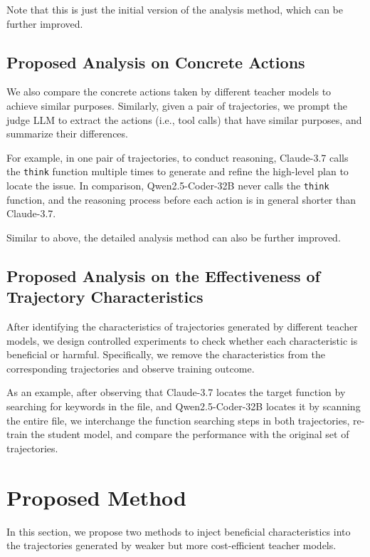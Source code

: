 Note that this is just the initial version of the analysis method, which can be further improved.

\subsection{Proposed Analysis on Concrete Actions}
We also compare the concrete actions taken by different teacher models to achieve similar purposes.
Similarly, given a pair of trajectories, we prompt the judge LLM to extract the actions (i.e., tool calls) that have similar purposes, and summarize their differences.

For example, in one pair of trajectories, to conduct reasoning, Claude-3.7 calls the \texttt{think} function multiple times to generate and refine the high-level plan to locate the issue.
In comparison, Qwen2.5-Coder-32B never calls the \texttt{think} function, and the reasoning process before each action is in general shorter than Claude-3.7.

Similar to above, the detailed analysis method can also be further improved.

\subsection{Proposed Analysis on the Effectiveness of Trajectory Characteristics}
After identifying the characteristics of trajectories generated by different teacher models, we design controlled experiments to check whether each characteristic is beneficial or harmful.
Specifically, we remove the characteristics from the corresponding trajectories and observe training outcome.

As an example, after observing that Claude-3.7 locates the target function by searching for keywords in the file, and Qwen2.5-Coder-32B locates it by scanning the entire file, we interchange the function searching steps in both trajectories, re-train the student model, and compare the performance with the original set of trajectories.


\section{Proposed Method}
In this section, we propose two methods to inject beneficial characteristics into the trajectories generated by weaker but more cost-efficient teacher models.

